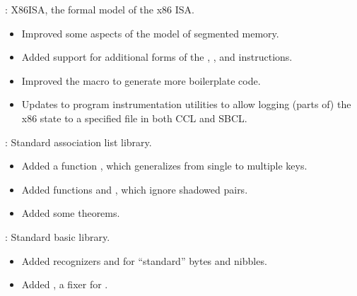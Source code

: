 
\begin{frame}

\implibtitle

:
X86ISA, the formal model of the x86 ISA.
\begin{itemize}
\item
Improved some aspects of the model of segmented memory.
\item
Added support for additional forms of the
, , and  instructions.
\item
Improved the  macro to generate more boilerplate code.
\item
Updates to program instrumentation utilities to allow logging (parts of) the x86 state to a specified file in both CCL and SBCL.
\end{itemize}

\end{frame}


\begin{frame}

\implibtitle

:
Standard association list library.
\begin{itemize}
\item
Added a function ,
which generalizes  from single to multiple keys.
\item
Added functions  and ,
which ignore shadowed pairs.
\item
Added some theorems.
\end{itemize}

\separation

:
Standard basic library.
\begin{itemize}
\item
Added recognizers  and 
for ``standard'' bytes and nibbles.
\item
Added , a fixer for .
\end{itemize}

\end{frame}


